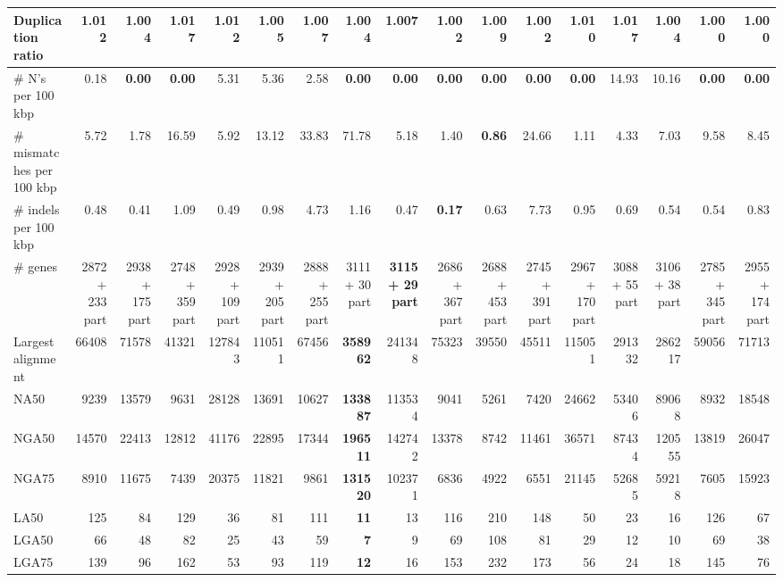 \documentclass[12pt,a4paper]{article}
\begin{document}
\begin{table}[ht]
\begin{center}
\begin{tabular}{|l*{16}{|r}|}
Duplication ratio & 1.012 & 1.004 & 1.017 & 1.012 & 1.005 & 1.007 & 1.004 & 1.007 & 1.002 & 1.009 & 1.002 & 1.010 & 1.017 & 1.004 & {\bf 1.000} & {\bf 1.000} \\ \hline
\# N's per 100 kbp & 0.18 & {\bf 0.00} & {\bf 0.00} & 5.31 & 5.36 & 2.58 & {\bf 0.00} & {\bf 0.00} & {\bf 0.00} & {\bf 0.00} & {\bf 0.00} & {\bf 0.00} & 14.93 & 10.16 & {\bf 0.00} & {\bf 0.00} \\ \hline
\# mismatches per 100 kbp & 5.72 & 1.78 & 16.59 & 5.92 & 13.12 & 33.83 & 71.78 & 5.18 & 1.40 & {\bf 0.86} & 24.66 & 1.11 & 4.33 & 7.03 & 9.58 & 8.45 \\ \hline
\# indels per 100 kbp & 0.48 & 0.41 & 1.09 & 0.49 & 0.98 & 4.73 & 1.16 & 0.47 & {\bf 0.17} & 0.63 & 7.73 & 0.95 & 0.69 & 0.54 & 0.54 & 0.83 \\ \hline
\# genes & 2872 + 233 part & 2938 + 175 part & 2748 + 359 part & 2928 + 109 part & 2939 + 205 part & 2888 + 255 part & 3111 + 30 part & {\bf 3115 + 29 part} & 2686 + 367 part & 2688 + 453 part & 2745 + 391 part & 2967 + 170 part & 3088 + 55 part & 3106 + 38 part & 2785 + 345 part & 2955 + 174 part \\ \hline
Largest alignment & 66408 & 71578 & 41321 & 127843 & 110511 & 67456 & {\bf 358962} & 241348 & 75323 & 39550 & 45511 & 115051 & 291332 & 286217 & 59056 & 71713 \\ \hline
NA50 & 9239 & 13579 & 9631 & 28128 & 13691 & 10627 & {\bf 133887} & 113534 & 9041 & 5261 & 7420 & 24662 & 53406 & 89068 & 8932 & 18548 \\ \hline
NGA50 & 14570 & 22413 & 12812 & 41176 & 22895 & 17344 & {\bf 196511} & 142742 & 13378 & 8742 & 11461 & 36571 & 87434 & 120555 & 13819 & 26047 \\ \hline
NGA75 & 8910 & 11675 & 7439 & 20375 & 11821 & 9861 & {\bf 131520} & 102371 & 6836 & 4922 & 6551 & 21145 & 52685 & 59218 & 7605 & 15923 \\ \hline
LA50 & 125 & 84 & 129 & 36 & 81 & 111 & {\bf 11} & 13 & 116 & 210 & 148 & 50 & 23 & 16 & 126 & 67 \\ \hline
LGA50 & 66 & 48 & 82 & 25 & 43 & 59 & {\bf 7} & 9 & 69 & 108 & 81 & 29 & 12 & 10 & 69 & 38 \\ \hline
LGA75 & 139 & 96 & 162 & 53 & 93 & 119 & {\bf 12} & 16 & 153 & 232 & 173 & 56 & 24 & 18 & 145 & 76 \\ \hline
\end{tabular}
\end{center}
\end{table}
\end{document}
